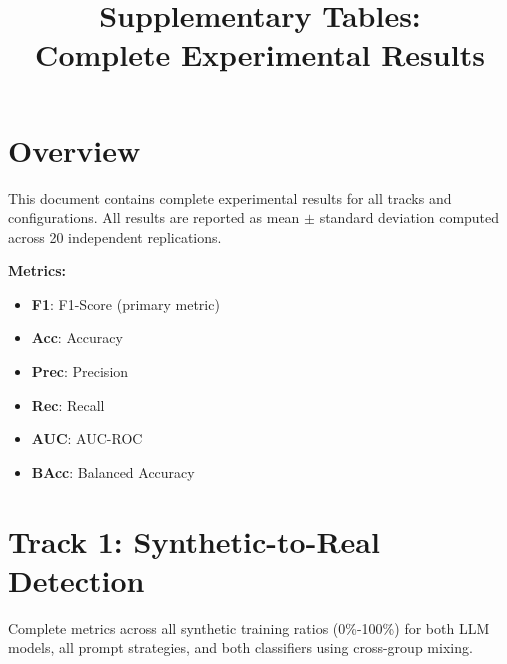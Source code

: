 \documentclass[11pt]{article}
\title{Supplementary Tables:\\
Complete Experimental Results}
\author{}
\date{}
\begin{document}
\maketitle

\section*{Overview}

This document contains complete experimental results for all tracks and configurations. 
All results are reported as mean $\pm$ standard deviation computed across 20 independent replications.

\textbf{Metrics:}
\begin{itemize}
\item \textbf{F1}: F1-Score (primary metric)
\item \textbf{Acc}: Accuracy
\item \textbf{Prec}: Precision
\item \textbf{Rec}: Recall
\item \textbf{AUC}: AUC-ROC
\item \textbf{BAcc}: Balanced Accuracy
\end{itemize}

\clearpage

\section*{Track 1: Synthetic-to-Real Detection}

Complete metrics across all synthetic training ratios (0\%-100\%) for both LLM models, 
all prompt strategies, and both classifiers using cross-group mixing.
\end{document}
